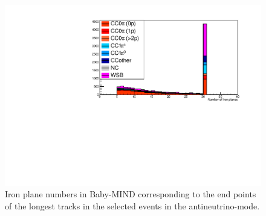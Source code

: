 \begin{figure}[tbh]
\begin{center}
\includegraphics[width=0.5\linewidth, angle=270]{fig/RHCMuonPenetration_DownstreamMRD_StoppedOrThroughGoing.pdf}
\end{center}
\caption{
Iron plane numbers in Baby-MIND corresponding to the end points of the longest tracks in the selected events in the antineutrino-mode.
}
\label{fig:endpoint_babymind_longest_track_antineutrino}
\end{figure}


%


